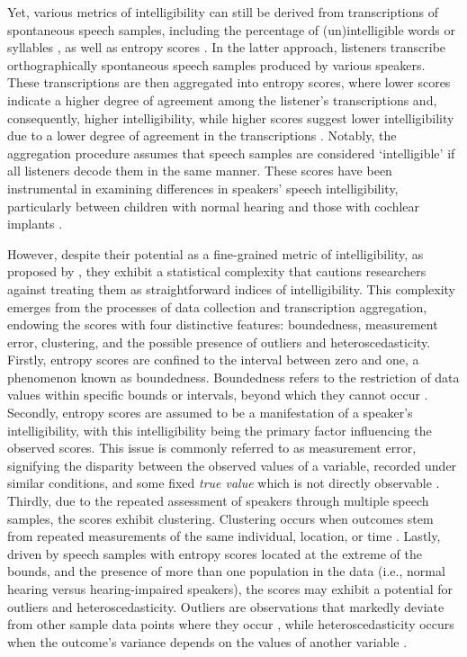 \documentclass[
  authoryear,
  preprint,
  1p]{elsarticle}
\begin{document}
{Yet, various metrics of intelligibility can still be derived from
transcriptions of spontaneous speech samples, including the percentage
of (un)intelligible words or syllables
\citep{Flipsen_2006, Lagerberg_et_al_2014}, as well as entropy scores
\citep{Boonen_et_al_2021}. In the latter approach, listeners transcribe
orthographically spontaneous speech samples produced by various
speakers.} These transcriptions are then aggregated into entropy scores,
where lower scores indicate a higher degree of agreement among the
listener's transcriptions and, consequently, higher intelligibility,
while higher scores suggest lower intelligibility due to a lower degree
of agreement in the transcriptions
\citep{Boonen_et_al_2021, Faes_et_al_2022}. Notably, the aggregation
procedure assumes that speech samples are considered `intelligible' if
all listeners decode them in the same manner. These scores have been
instrumental in examining differences in speakers' speech
intelligibility, particularly between children with normal hearing and
those with cochlear implants \citep{Boonen_et_al_2021}.

However, despite their potential as a fine-grained metric of
intelligibility, as proposed by \citet{Boonen_et_al_2021}, they exhibit
a statistical complexity that cautions researchers against treating them
as straightforward indices of intelligibility. This complexity emerges
from the processes of data collection and transcription aggregation,
endowing the scores with four distinctive features: boundedness,
measurement error, clustering, and the possible presence of outliers and
heteroscedasticity. Firstly, entropy scores are confined to the interval
between zero and one, a phenomenon known as boundedness. Boundedness
refers to the restriction of data values within specific bounds or
intervals, beyond which they cannot occur \citep{Lebl_2022}. {Secondly,
entropy scores are assumed to be a manifestation of a speaker's
intelligibility, with this intelligibility being the primary factor
influencing the observed scores.} This issue is commonly referred to as
measurement error, signifying the disparity between the observed values
of a variable, recorded under similar conditions, and some fixed
\emph{true value} which is not directly observable
\citep{Everitt_et_al_2010}. Thirdly, due to the repeated assessment of
speakers through multiple speech samples, the scores exhibit clustering.
Clustering occurs when outcomes stem from repeated measurements of the
same individual, location, or time \citep{McElreath_2020}. {Lastly,
driven by speech samples with entropy scores located at the extreme of
the bounds, and the presence of more than one population in the data
(i.e., normal hearing versus hearing-impaired speakers), the scores may
exhibit a potential for outliers and heteroscedasticity. Outliers are
observations that markedly deviate from other sample data points where
they occur \citep{Grubbs_1969}, while heteroscedasticity occurs when the
outcome's variance depends on the values of another variable
\citep{Everitt_et_al_2010}.}
\end{document}
